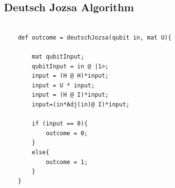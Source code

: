 \subsection{Deutsch Jozsa Algorithm}
\begin{lstlisting}

	def outcome = deutschJozsa(qubit in, mat U){
		
		mat qubitInput;
		qubitInput = in @ |1>;
		input = (H @ H)*input;
		input = U * input;
		input = (H @ I)*input;
		input=(in*Adj(in)@ I)*input;
		
		if (input == 0){
			outcome = 0;
		}
		else{
			outcome = 1;
		}
	}
	
\end{lstlisting}
